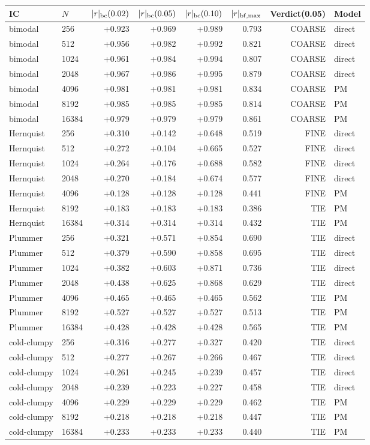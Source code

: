 \begin{tabular}{llrrrrrl}
\toprule
IC & $N$ & $|r|_{\rm bc}(0.02)$ & $|r|_{\rm bc}(0.05)$ & $|r|_{\rm bc}(0.10)$ & $|r|_{\rm bf,max}$ & Verdict(0.05) & Model\\
\midrule
bimodal & 256 & +0.923 & +0.969 & +0.989 & 0.793 & COARSE & direct\\
bimodal & 512 & +0.956 & +0.982 & +0.992 & 0.821 & COARSE & direct\\
bimodal & 1024 & +0.961 & +0.984 & +0.994 & 0.807 & COARSE & direct\\
bimodal & 2048 & +0.967 & +0.986 & +0.995 & 0.879 & COARSE & direct\\
bimodal & 4096 & +0.981 & +0.981 & +0.981 & 0.834 & COARSE & PM\\
bimodal & 8192 & +0.985 & +0.985 & +0.985 & 0.814 & COARSE & PM\\
bimodal & 16384 & +0.979 & +0.979 & +0.979 & 0.861 & COARSE & PM\\
\midrule
Hernquist & 256 & +0.310 & +0.142 & +0.648 & 0.519 & FINE & direct\\
Hernquist & 512 & +0.272 & +0.104 & +0.665 & 0.527 & FINE & direct\\
Hernquist & 1024 & +0.264 & +0.176 & +0.688 & 0.582 & FINE & direct\\
Hernquist & 2048 & +0.270 & +0.184 & +0.674 & 0.577 & FINE & direct\\
Hernquist & 4096 & +0.128 & +0.128 & +0.128 & 0.441 & FINE & PM\\
Hernquist & 8192 & +0.183 & +0.183 & +0.183 & 0.386 & TIE & PM\\
Hernquist & 16384 & +0.314 & +0.314 & +0.314 & 0.432 & TIE & PM\\
\midrule
Plummer & 256 & +0.321 & +0.571 & +0.854 & 0.690 & TIE & direct\\
Plummer & 512 & +0.379 & +0.590 & +0.858 & 0.695 & TIE & direct\\
Plummer & 1024 & +0.382 & +0.603 & +0.871 & 0.736 & TIE & direct\\
Plummer & 2048 & +0.438 & +0.625 & +0.868 & 0.629 & TIE & direct\\
Plummer & 4096 & +0.465 & +0.465 & +0.465 & 0.562 & TIE & PM\\
Plummer & 8192 & +0.527 & +0.527 & +0.527 & 0.513 & TIE & PM\\
Plummer & 16384 & +0.428 & +0.428 & +0.428 & 0.565 & TIE & PM\\
\midrule
cold-clumpy & 256 & +0.316 & +0.277 & +0.327 & 0.420 & TIE & direct\\
cold-clumpy & 512 & +0.277 & +0.267 & +0.266 & 0.467 & TIE & direct\\
cold-clumpy & 1024 & +0.261 & +0.245 & +0.239 & 0.457 & TIE & direct\\
cold-clumpy & 2048 & +0.239 & +0.223 & +0.227 & 0.458 & TIE & direct\\
cold-clumpy & 4096 & +0.229 & +0.229 & +0.229 & 0.462 & TIE & PM\\
cold-clumpy & 8192 & +0.218 & +0.218 & +0.218 & 0.447 & TIE & PM\\
cold-clumpy & 16384 & +0.233 & +0.233 & +0.233 & 0.440 & TIE & PM\\
\bottomrule
\end{tabular}
